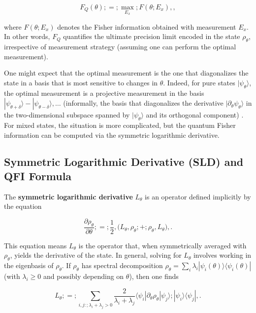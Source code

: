 \begin{equation}
F_Q(\theta) ;=; \max_{{E_x}} ; F(\theta;{E_x}) ,,
\end{equation}

where $F(\theta;{E_x})$ denotes the Fisher information obtained with
measurement ${E_x}$. In other words, $F_Q$ quantifies the ultimate
precision limit encoded in the state $\rho_\theta$, irrespective of
measurement strategy (assuming one can perform the optimal
measurement).



One might expect that the optimal measurement is the one that
diagonalizes the state in a basis that is most sensitive to changes in
$\theta$. Indeed, for pure states $|\psi_\theta\rangle$, the optimal
measurement is a projective measurement in the basis
${|\psi_{\theta+\delta}\rangle - |\psi_{\theta-\delta}\rangle,
  \ldots}$ (informally, the basis that diagonalizes the derivative
$|\partial_\theta \psi_\theta\rangle$ in the two-dimensional subspace
spanned by $|\psi_\theta\rangle$ and its orthogonal component)
\cite{BraunsteinCaves1994}. For mixed states, the situation is more
complicated, but the quantum Fisher information can be computed via
the symmetric logarithmic derivative.



\subsection{Symmetric Logarithmic Derivative (SLD) and QFI Formula}



The \textbf{symmetric logarithmic derivative} $L_\theta$ is an operator defined implicitly by the equation

\begin{equation}
\frac{\partial \rho_\theta}{\partial \theta} ;=; \frac{1}{2},\big( L_\theta,\rho_\theta ;+; \rho_\theta,L_\theta \big) ,.
\label{eq:SLD-def}
\end{equation}

This equation means $L_\theta$ is the operator that, when
symmetrically averaged with $\rho_\theta$, yields the derivative of
the state. In general, solving for $L_\theta$ involves working in the
eigenbasis of $\rho_\theta$. If $\rho_\theta$ has spectral
decomposition $\rho_\theta = \sum_i \lambda_i
|\psi_i(\theta)\rangle\langle \psi_i(\theta)|$ (with $\lambda_i\ge0$
and possibly depending on $\theta$), then one finds

\begin{equation}
L_\theta ;=; \sum_{i,j:;\lambda_i + \lambda_j > 0} \frac{2}{\lambda_i + \lambda_j} \langle \psi_i|\partial_\theta \rho_\theta|\psi_j \rangle ;|\psi_i\rangle\langle \psi_j| ,.
\label{eq:SLD-eigenbasis}
\end{equation}

